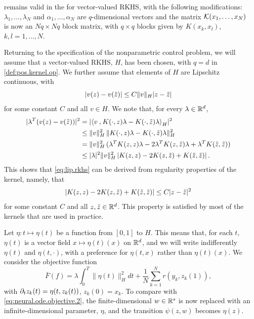  remains valid in the for vector-valued RKHS, with the following modifications: $\lambda_1, \ldots, \lambda_N$ and $\alpha_1, \ldots, \alpha_N$ are $q$-dimensional vectors and the matrix ${\mathcal K}(x_1, \ldots, x_N)$ is 
now an $Nq\times Nq$ block matrix, with $q\times q$ blocks given by $K(x_k,x_l)$, $k,l= 1, \ldots, N$.

Returning to the specification of the nonparametric control problem, we will assume that a vector-valued RKHS, $H$, has been chosen, with $q=d$ in \cref{def:pos.kernel.op}. We further assume that elements of $H$ are Lipschitz continuous, with
\begin{equation}
\label{eq:lip.rkhs}
|v(z) - v(\tilde z)| \leq C \|v\|_H |z-{\tilde{z}}|
\end{equation}
for some constant $C$ and all $v\in H$. We note that, for every $\lambda\in {\mathbb{R}}^d$,
\begin{align*}
|\lambda^T(v(z) - v(\tilde z))|^2 & = |{\langle {v}\mathbin{,} {K(\cdot, z)\lambda - K(\cdot, {\tilde{z}})\lambda}\rangle}_H|^2\\
& \leq \|v\|_H^2\, \|K(\cdot, z)\lambda - K(\cdot, {\tilde{z}})\lambda\|_H^2\\
& = \|v\|_H^2\, (\lambda^T K(z, z)\lambda -2 \lambda^T K(z, {\tilde{z}})\lambda + \lambda^T K({\tilde{z}}, {\tilde{z}}))\\
&\leq |\lambda|^2 \|v\|_H^2\, |K(z, z) -2 K(z, {\tilde{z}}) + K({\tilde{z}}, {\tilde{z}})|\,.
\end{align*}
This shows that \cref{eq:lip.rkhs} can be derived from regularity properties of the kernel, namely, that
\[
|K(z, z) -2 K(z, {\tilde{z}}) + K({\tilde{z}}, {\tilde{z}})| \leq C |z-{\tilde{z}}|^2
\]
for some constant $C$ and all $z, {\tilde{z}}\in {\mathbb{R}}^d$. This property is satisfied by most of the kernels that are used in practice.

Let $\eta: t\mapsto \eta(t)$ be a function from $[0,1]$ to $H$. This means that, for each $t$, $\eta(t)$ is a vector field $x \mapsto \eta(t)(x)$ on ${\mathbb{R}}^d$, and we will write indifferently $\eta(t)$ and $\eta(t, \cdot)$, with a preference for $\eta(t,x)$ rather than $\eta(t)(x)$. We consider the objective function
\begin{equation}
\label{eq:ode.objective.2}
\bar F(f) = \lambda \int_0^T \|\eta(t)\|_H^2 dt + \frac1N \sum_{k=1}^N r(y_k, z_k(1)),
\end{equation}
with $\partial_t z_k(t) = \eta(t, z_k(t))$, $z_k(0) = x_k$. To compare with \cref{eq:neural.ode.objective.2}, the finite-dimensional $w\in {\mathbb{R}}^s$ is now replaced with an infinite-dimensional parameter, $\eta$, and the transition $\psi(z,w)$ becomes $\eta(z)$. 

